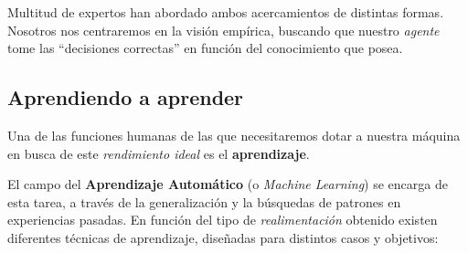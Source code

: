 Multitud de expertos han abordado ambos acercamientos de distintas formas. Nosotros nos centraremos en la visión empírica, buscando que nuestro \textit{agente} tome las ``decisiones correctas'' en función del conocimiento que posea.

\subsection{Aprendiendo a aprender}
Una de las funciones humanas de las que necesitaremos dotar a nuestra máquina en busca de este \textit{rendimiento ideal} es el \textbf{aprendizaje}.

El campo del \textbf{Aprendizaje Automático} (o \textit{Machine Learning}) se encarga de esta tarea, a través de la generalización y la búsquedas de patrones en experiencias pasadas. En función del tipo de \textit{realimentación} obtenido existen diferentes técnicas de aprendizaje, diseñadas para distintos casos y objetivos:
